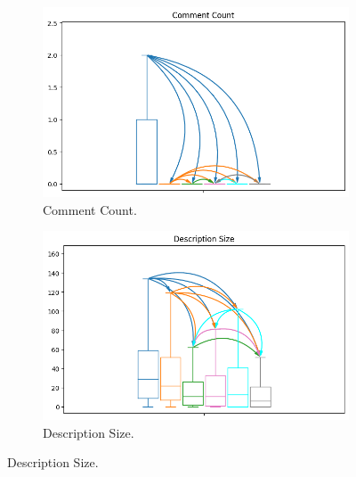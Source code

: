 \documentclass[10pt,a4paper,twocolumn]{article}
\begin{document}
\begin{figure}
    \begin{subfigure}{.4\textwidth}
      \centering
      \includegraphics[width=\linewidth]{rq2_mw/comment count_high_conf_plot_arrows.png}
      \caption{Comment Count.}
    \end{subfigure}
    \begin{subfigure}{.4\textwidth}
      \centering
      \includegraphics[width=\linewidth]{rq2_mw/description size_high_conf_plot_arrows.png}
      \caption{Description Size.}
    \end{subfigure}
    

\end{figure}
\end{document}
